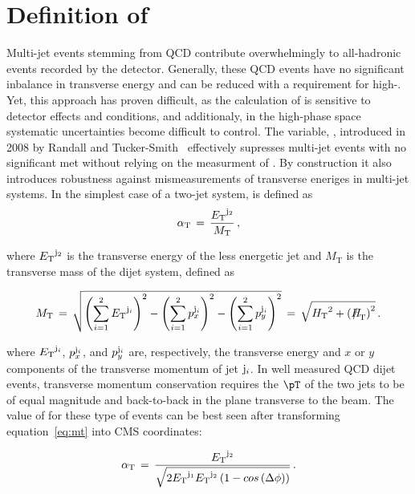 \clearpage
\section{Definition of \texorpdfstring{\alphat}{AlphaT}\label{sec:alphat}}

Multi-jet events stemming from QCD contribute overwhelmingly to
all-hadronic events recorded by the detector. Generally, these QCD events
have no significant inbalance in transverse energy and can 
be reduced with a requirement for high-\met. Yet, this approach has proven difficult, 
as the calculation of \met is sensitive to detector effects and conditions, 
and additionaly, in the high-\met phase space systematic uncertainties become difficult
to control. The variable, \alphat, introduced in 2008 by Randall and 
Tucker-Smith~\cite{Randall:2008rw} effectively supresses multi-jet 
events with no significant met without relying on the measurment
of \met. By construction it also introduces robustness against mismeasurements 
of transverse eneriges in multi-jet systems.  In the simplest case of a two-jet system,
\alphat is defined as
\begin{equation}
\label{eq:alphat}
\alpha_{\text{T}}\, =\, \frac{{E_{\text T}}^{{\rm j}_2}}{M_\text{T}} \, ,
\end{equation}

where ${E_{\text T}}^{\rm j_2}$ is the transverse energy of the less energetic
jet and $M_\text{T}$ is the transverse mass of the dijet system,
defined as

\begin{equation}
  \label{eq:mt}
  M_\text{T}\, = \,\sqrt{ \left( \sum_{i=1}^2 \Et^{{\rm j}_i}
    \right)^2 - \left( \sum_{i=1}^2 p_x^{{\rm j}_i} \right)^2 - \left(
      \sum_{i=1}^2 p_y^{{\rm j}_i} \right)^2} \, = \,\sqrt{\scalht^2 + \left(\mht\right)^2} \,  .
\end{equation}

where ${E_{\text T}}^{{\rm j}_i}$, $p_x^{{\rm j}_i}$, and $p_y^{{\rm j}_i}$ are,
respectively, the transverse energy and $x$ or $y$ components of the
transverse momentum of jet ${\rm j}_i$. In well measured QCD dijet events, 
transverse momentum conservation requires the $\pT$ of the two jets to be 
of equal magnitude and back-to-back in the plane transverse to the beam.
The value of \alphat for these type of events can be best seen
after transforming equation~\ref{eq:mt} into CMS coordinates:

\begin{equation}
  \label{eq:mt-polar}
  \alpha_{\text{T}}\, = \,\frac{{E_{\text T}}^{{\rm j}_2}}{\sqrt{2{E_{\text T}}^{{\rm j}_1}
   {E_{\text T}}^{{\rm j}_2} \left(1-cos\left(\Delta\phi\right)\right)}}\, .
\end{equation}


